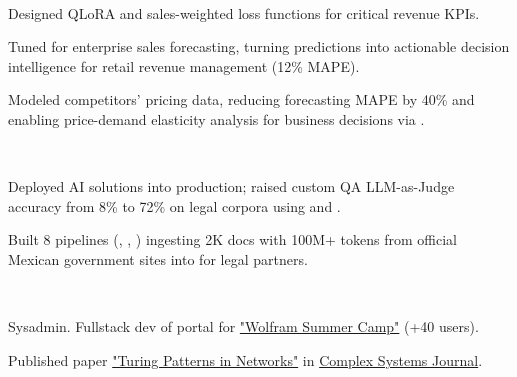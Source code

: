 \documentclass{tex/deedy-resume-openfont}
\begin{document}
\begin{minipage}[t]{0.67\textwidth}
\\
\begin{tightemize}
    \item Designed QLoRA and sales-weighted loss functions for critical revenue KPIs.
    \item Tuned   for enterprise sales forecasting, turning predictions into actionable decision intelligence for retail revenue management (12\% MAPE).
    \item Modeled competitors' pricing data, reducing forecasting MAPE by 40\% and enabling price-demand elasticity analysis for business decisions via .
\end{tightemize}
\sectionsep

\\
\begin{tightemize}
    \item Deployed  AI solutions into production; raised custom QA LLM-as-Judge accuracy from 8\% to 72\% on legal corpora using  and .
    \item Built 8  pipelines (, , ) ingesting 2K docs with 100M+ tokens from official Mexican government sites into  for legal partners.
\end{tightemize}
\sectionsep

\\
\begin{tightemize}
    \item Sysadmin. Fullstack dev of portal for \href{https://www.notebookarchive.org/collection-pod?collection=wolfram-summer-school-2021}{"Wolfram Summer Camp"} (+40 users).
    \item Published paper \href{https://www.complex-systems.com/abstracts/v32_i03_a02/}{"Turing Patterns in Networks"} in \href{https://www.complex-systems.com/}{Complex Systems Journal}.
\end{tightemize}


\end{minipage}
\end{document}
